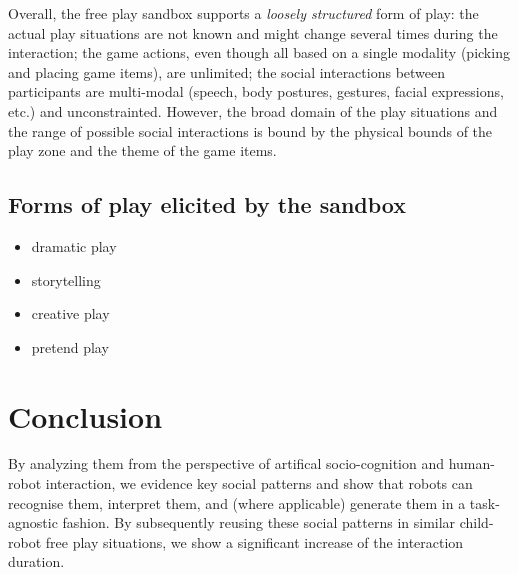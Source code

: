 \documentclass{article}
\begin{document}
Overall, the free play sandbox supports a \emph{loosely structured} form of play: the
actual play situations are not known and might change several times during the
interaction; the game actions, even though all based on a single modality (picking and
placing game items), are unlimited; the social interactions between participants
are multi-modal (speech, body postures, gestures, facial expressions, etc.) and
unconstrainted. However, the broad domain of the play situations and the range of
possible social interactions is bound by the physical bounds of the play zone
and the theme of the game items.

\subsection{Forms of play elicited by the sandbox}

\begin{itemize}
    \item dramatic play
    \item storytelling
    \item creative play
    \item pretend play
\end{itemize}

\section{Conclusion}


By analyzing them from the
perspective of artifical socio-cognition and human-robot interaction, we
evidence key social patterns and show that robots can recognise them,
interpret them, and (where applicable) generate them in a task-agnostic
fashion. By subsequently reusing these social patterns in similar
child-robot free play situations, we show a significant increase of the
interaction duration.




\end{document}
